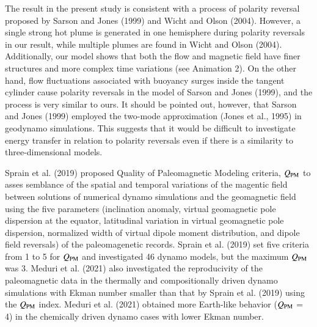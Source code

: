 {\color{teal}
The result in the present study is consistent with a process of polarity reversal proposed by Sarson and Jones (1999) and Wicht and Olson (2004).
However, a single strong hot plume is generated in one hemisphere during polarity reversals in our result, while multiple plumes are found in Wicht and Olson (2004).
{\color{red}
Additionally, our model shows that both the flow and magnetic field have finer structures and more complex time variations (see Animation 2).
}
On the other hand, flow fluctuations associated with buoyancy surges inside the tangent cylinder cause polarity reversals in the model of Sarson and Jones (1999), and the process is very similar to ours.
It should be pointed out, however, that Sarson and Jones (1999) employed the two-mode approximation (Jones et al., 1995) in geodynamo simulations.
This suggests that it would be difficult to investigate energy transfer in relation to polarity reversals even if there is a similarity to three-dimensional models.
}


{\color{red}
Sprain et al. (2019) proposed Quality of Paleomagnetic Modeling criteria, $Q_{\rm PM}$ to asses semblance of the spatial and temporal variations of the magentic field between solutions of numerical dynamo simulations and the geomagnetic field using the five parameters (inclination anomaly, virtual geomagnetic pole dispersion at the equator, latitudinal variation in virtual geomagnetic pole dispersion, normalized width of virtual dipole moment distribution, and dipole field reversals) of the paleomagenetic records. Sprain et al. (2019) set five criteria from 1 to 5 for $Q_{\rm PM}$ and investigated 46 dynamo models, but the maximum $Q_{\rm PM}$ was 3. Meduri et al. (2021) also investigated the reproducivity of the paleomagnetic data in the thermally and compositionally driven dynamo simulations with Ekman number smaller than that by Sprain et al. (2019) using the $Q_{\rm PM}$ index. Meduri et al. (2021) obtained more Earth-like behavior ($Q_{\rm PM}$ = 4) in the chemically driven dynamo cases with lower Ekman number.
}

